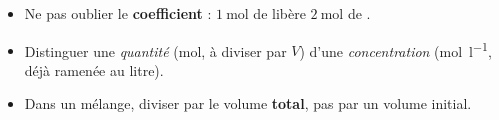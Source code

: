 \documentclass[11pt,a4paper]{article}
\begin{document}
\begin{piege}
\begin{itemize}[leftmargin=1.4em,topsep=1pt,itemsep=1pt]
  \item Ne pas oublier le \textbf{coefficient} : $\SI{1}{\mole}$ de  libère $\SI{2}{\mole}$ de .
  \item Distinguer une \emph{quantité} (\si{\mole}, à diviser par $V$) d'une \emph{concentration}
        (\si{\mole\per\litre}, déjà ramenée au litre).
  \item Dans un mélange, diviser par le volume \textbf{total}, pas par un volume initial.
\end{itemize}
\end{piege}
\end{document}
